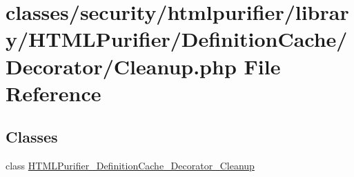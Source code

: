 \hypertarget{Cleanup_8php}{\section{classes/security/htmlpurifier/library/\+H\+T\+M\+L\+Purifier/\+Definition\+Cache/\+Decorator/\+Cleanup.php File Reference}
\label{Cleanup_8php}
}
\subsection*{Classes}
\begin{DoxyCompactItemize}
\item 
class \hyperlink{classHTMLPurifier__DefinitionCache__Decorator__Cleanup}{H\+T\+M\+L\+Purifier\+\_\+\+Definition\+Cache\+\_\+\+Decorator\+\_\+\+Cleanup}
\end{DoxyCompactItemize}
